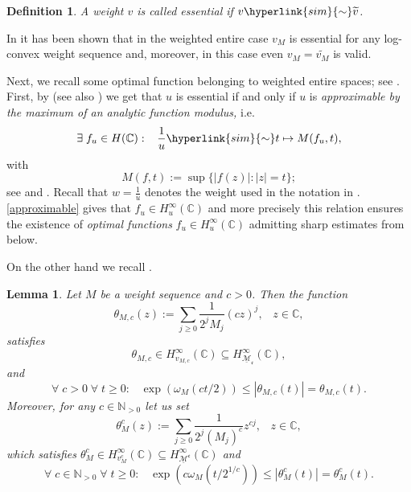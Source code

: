 \documentclass[10pt]{amsart}%
\numberwithin{equation}{section}
\theoremstyle{plain}
\newtheorem{lemma}[proposition]{Lemma}
\newtheorem{definition}[proposition]{Definition}
\newcommand{\CC}{\mathbb{C}}
\newcommand{\NN}{\mathbb{N}}
\begin{document}
\begin{definition}
A weight $v$ is called {\itshape essential} if $v\hyperlink{sim}{\sim}\widetilde{v}$.
\end{definition}

In \cite[Thm. 3.4]{weightedentirecharacterization} it has been shown that in the weighted entire case $v_M$ is essential for any log-convex weight sequence and, moreover, in this case even $v_M=\widetilde{v_M}$ is valid.

Next, we recall some optimal function belonging to weighted entire spaces; see \cite[Sect. 3.1 \& 3.2]{weightedentirecharacterization}. First, by \cite[Thm. 2]{AbakumovDoubtsov18} (see also \cite[Thm. 3]{Bonet2022survey}) we get that $u$ is essential if and only if $u$ is {\itshape approximable by the maximum of an analytic function modulus,} i.e.
\begin{equation}\label{approximable}
\exists\;f_u\in H(\CC):\;\;\;\frac{1}{u}\hyperlink{sim}{\sim} t\mapsto M(f_u,t),
\end{equation}
with
$$M(f,t):=\sup\{|f(z)|: |z|=t\};$$
see \cite[Def. 3]{AbakumovDoubtsov18} and \cite[p. 3 \& p. 5]{Bonet2022survey}. Recall that $w=\frac{1}{u}$ denotes the weight used in the notation in \cite{AbakumovDoubtsov18}. \eqref{approximable} gives that $f_u\in H^{\infty}_u(\CC)$ and more precisely this relation ensures the existence of {\itshape optimal functions} $f_u\in H^{\infty}_u(\CC)$ admitting sharp estimates from below.

On the other hand we recall \cite[Lemma 3.10, Rem. 3.12]{weightedentirecharacterization}.

\begin{lemma}\label{charholomfctlemma}
Let $M$ be a weight sequence and $c>0$. Then the function
$$\theta_{M,c}(z):=\sum_{j\ge 0}\frac{1}{2^jM_j}(cz)^j,\;\;\;z\in\CC,$$
satisfies
$$\theta_{M,c}\in H^{\infty}_{v_{M,c}}(\CC)\subseteq H^{\infty}_{\underline{\mathcal{M}}_{\mathfrak{c}}}(\CC),$$
and
\begin{equation}\label{charholomfctlemmaequ}
\forall\;c>0\;\forall\;t\ge 0:\;\;\;\exp(\omega_M(ct/2))\le|\theta_{M,c}(t)|=\theta_{M,c}(t).
\end{equation}
Moreover, for any $c\in\NN_{>0}$ let us set
\begin{equation}\label{charholomfctpow}
\theta^c_M(z):=\sum_{j\ge 0}\frac{1}{2^j(M_j)^c}z^{cj},\;\;\;z\in\CC,
\end{equation}
which satisfies $\theta^c_M\in H^{\infty}_{v^c_M}(\CC)\subseteq H^{\infty}_{\underline{\mathcal{M}}^{\mathfrak{c}}}(\CC)$ and
\begin{equation}\label{charholomfctlemmaequ1}
\forall\;c\in\NN_{>0}\;\forall\;t\ge 0:\;\;\;\exp(c\omega_M(t/2^{1/c}))\le|\theta^c_M(t)|=\theta^c_M(t).
\end{equation}
\end{lemma}
\end{document}
